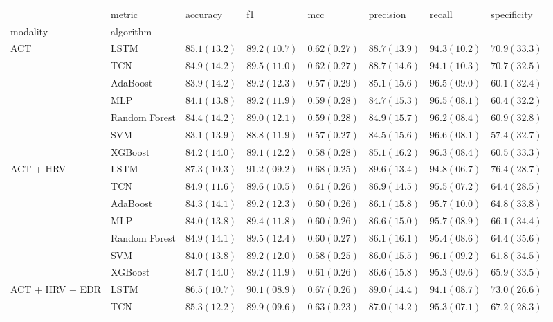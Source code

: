 \begin{tabular}{llllllll}
 & metric & accuracy & f1 & mcc & precision & recall & specificity \\
modality & algorithm &  &  &  &  &  &  \\
\multirow[c]{7}{*}{ACT} & LSTM & $85.1 (13.2)$ & $89.2 (10.7)$ & $0.62 (0.27)$ & $88.7 (13.9)$ & $94.3 (10.2)$ & $70.9 (33.3)$ \\
 & TCN & $84.9 (14.2)$ & $89.5 (11.0)$ & $0.62 (0.27)$ & $88.7 (14.6)$ & $94.1 (10.3)$ & $70.7 (32.5)$ \\
 & AdaBoost & $83.9 (14.2)$ & $89.2 (12.3)$ & $0.57 (0.29)$ & $85.1 (15.6)$ & $96.5 (09.0)$ & $60.1 (32.4)$ \\
 & MLP & $84.1 (13.8)$ & $89.2 (11.9)$ & $0.59 (0.28)$ & $84.7 (15.3)$ & $96.5 (08.1)$ & $60.4 (32.2)$ \\
 & Random Forest & $84.4 (14.2)$ & $89.0 (12.1)$ & $0.59 (0.28)$ & $84.9 (15.7)$ & $96.2 (08.4)$ & $60.9 (32.8)$ \\
 & SVM & $83.1 (13.9)$ & $88.8 (11.9)$ & $0.57 (0.27)$ & $84.5 (15.6)$ & $96.6 (08.1)$ & $57.4 (32.7)$ \\
 & XGBoost & $84.2 (14.0)$ & $89.1 (12.2)$ & $0.58 (0.28)$ & $85.1 (16.2)$ & $96.3 (08.4)$ & $60.5 (33.3)$ \\
\multirow[c]{7}{*}{ACT + HRV} & LSTM & $87.3 (10.3)$ & $91.2 (09.2)$ & $0.68 (0.25)$ & $89.6 (13.4)$ & $94.8 (06.7)$ & $76.4 (28.7)$ \\
 & TCN & $84.9 (11.6)$ & $89.6 (10.5)$ & $0.61 (0.26)$ & $86.9 (14.5)$ & $95.5 (07.2)$ & $64.4 (28.5)$ \\
 & AdaBoost & $84.3 (14.1)$ & $89.2 (12.3)$ & $0.60 (0.26)$ & $86.1 (15.8)$ & $95.7 (10.0)$ & $64.8 (33.8)$ \\
 & MLP & $84.0 (13.8)$ & $89.4 (11.8)$ & $0.60 (0.26)$ & $86.6 (15.0)$ & $95.7 (08.9)$ & $66.1 (34.4)$ \\
 & Random Forest & $84.9 (14.1)$ & $89.5 (12.4)$ & $0.60 (0.27)$ & $86.1 (16.1)$ & $95.4 (08.6)$ & $64.4 (35.6)$ \\
 & SVM & $84.0 (13.8)$ & $89.2 (12.0)$ & $0.58 (0.25)$ & $86.0 (15.5)$ & $96.1 (09.2)$ & $61.8 (34.5)$ \\
 & XGBoost & $84.7 (14.0)$ & $89.2 (11.9)$ & $0.61 (0.26)$ & $86.6 (15.8)$ & $95.3 (09.6)$ & $65.9 (33.5)$ \\
\multirow[c]{7}{*}{ACT + HRV + EDR} & LSTM & $86.5 (10.7)$ & $90.1 (08.9)$ & $0.67 (0.26)$ & $89.0 (14.4)$ & $94.1 (08.7)$ & $73.0 (26.6)$ \\
 & TCN & $85.3 (12.2)$ & $89.9 (09.6)$ & $0.63 (0.23)$ & $87.0 (14.2)$ & $95.3 (07.1)$ & $67.2 (28.3)$ \\

\end{tabular}
